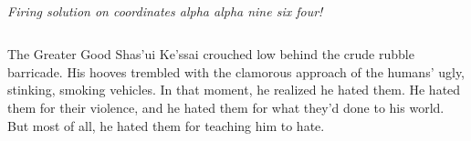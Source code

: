 \documentclass{40k}
\begin{document}
\begin{columns}
\vfill
\noindent%
\begin{minipage}[h]{1.0\linewidth}\centering\small\it%
\\
Firing solution on coordinates alpha alpha nine six four!
\end{minipage}

\end{columns}

\vfill
\begin{story}{0.4in}{The Greater Good}
  Shas'ui Ke'ssai crouched low behind the crude rubble barricade.  His
  hooves trembled with the clamorous approach of the humans' ugly,
  stinking, smoking vehicles.  In that moment, he realized he hated
  them.  He hated them for their violence, and he hated them for what
  they'd done to his world.  But most of all, he hated them for
  teaching him to hate.
\end{story}



\pagebreak
{}%

\end{document}
